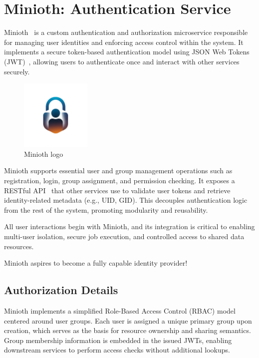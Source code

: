 \section{Minioth: Authentication Service}

Minioth~\cite{minioth} is a custom authentication and authorization microservice responsible for managing user identities and enforcing access control
within the system. It implements a secure token-based authentication model using JSON Web Tokens (JWT)~\cite{jwt-spec}, allowing users to authenticate
once and interact with other services securely.

\begin{figure}[h]
  \centering
  \includegraphics[width=0.3\textwidth]{Images/minioth_logo_chatgpt_draft1.png}
  \caption{Minioth logo}
  \label{fig:miniothlogo}
\end{figure}

Minioth supports essential user and group management operations such as registration, login, group assignment, and permission checking.
It exposes a RESTful API~\cite{fielding-rest} that other services use to validate user tokens and retrieve identity-related metadata (e.g., UID, GID). 
This decouples authentication logic from the rest of the system, promoting modularity and reusability.

All user interactions begin with Minioth, and its integration is critical to enabling multi-user isolation, secure job execution, and 
controlled access to shared data resources.

Minioth aspires to become a fully capable identity provider!

\subsection{Authorization Details}

Minioth implements a simplified Role-Based Access Control (RBAC) model centered around user groups. Each user is assigned a unique primary group upon creation, which serves as the basis for resource ownership and sharing semantics. Group membership information is embedded in the issued JWTs, enabling downstream services to perform access checks without additional lookups.


